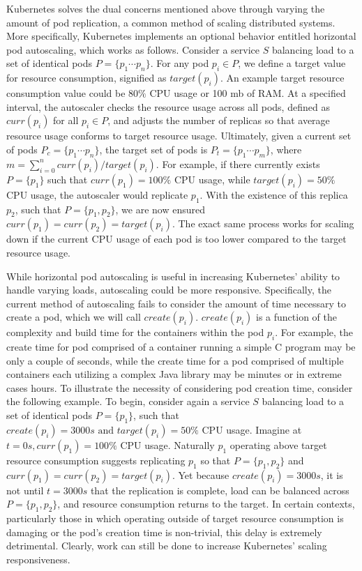 \documentclass[letterpaper,11pt,twocolumn]{article}
\begin{document}
Kubernetes solves the dual concerns mentioned above through varying the amount
of pod replication, a common method of scaling distributed systems.\cite[pg.
15]{distributed-systems-principles-and-paradigms} More specifically, Kubernetes
implements an optional behavior entitled horizontal pod autoscaling, which works
as follows. Consider a service $S$ balancing load to a set of identical pods $P =
\{p_{1} \cdots p_{n}\}$. For any pod $p_{i} \in P$, we define a target value for
resource consumption, signified as $target(p_{i})$. An example target resource
consumption value could be $80\%$ CPU usage or 100 mb of RAM. At a specified
interval, the autoscaler checks the resource usage across all pods, defined as
$curr(p_{i})$ for all $p_{i} \in P$, and adjusts the number of replicas so that
average resource usage conforms to target resource usage. Ultimately, given a
current set of pods $P_{c} = \{p_{1} \cdots p_{n}\}$, the target set
of pods is $P_{t} = \{p_{1} \cdots p_{m}\}$, where $m = \sum_{i =
0}^{n} curr(p_{i}) / target(p_{i})$. For example, if there currently exists
$P = \{p_{1}\}$ such that $curr(p_{1}) = 100\%$ CPU usage, while
$target(p_{i}) = 50\%$ CPU usage, the autoscaler would replicate
$p_{1}$. With the existence of this replica $p_{2}$, such that $P =
\{p_{1}, p_{2}\}$, we are now ensured $curr(p_{1}) = curr(p_{2}) =
target(p_{i})$. The exact same process works for scaling down if the current CPU
usage of each pod is too lower compared to the target resource
usage.\cite{k8s-horizontal-pod-autoscaler-proposal}

While horizontal pod autoscaling is useful in increasing Kubernetes' ability to
handle varying loads, autoscaling could be more responsive. Specifically, the
current method of autoscaling fails to consider the amount of time necessary to
create a pod, which we will call
$create(p_{i})$.\cite{brendan-burns-conversation} $create(p_{i})$ is a function
of the complexity and build time for the containers within the pod $p_{i}$. For
example, the create time for pod comprised of a container running
a simple C program may be only a couple
of seconds, while the create time for a pod comprised of multiple containers each
utilizing a complex Java library may be minutes or in extreme cases hours. To
illustrate the necessity of considering pod creation time, consider the
following example.
To begin, consider again a service $S$ balancing load to a set of identical pods
$P = \{p_{1}\}$, such that $create(p_{i}) = 3000s \mbox{ and } target(p_{i}) =
50\%$ CPU usage. Imagine at $t = 0s, curr(p_{1}) = 100\%$ CPU usage. Naturally
$p_{1}$ operating above target resource consumption suggests replicating
$p_{1}$ so that $P = \{p_{1}, p_{2}\}$ and $curr(p_{1}) = curr(p_{2}) =
target(p_{i})$. Yet because $create(p_{i}) = 3000s$, it is not until $t = 3000s$
that the replication is complete, load can be balanced across $P =
\{p_{1}, p_{2}\}$, and resource consumption returns to the target. In certain
contexts, particularly those in which operating outside of target resource
consumption is damaging or the pod's creation time is non-trivial, this delay is
extremely detrimental. Clearly, work can still be done to increase Kubernetes'
scaling responsiveness.
\end{document}
